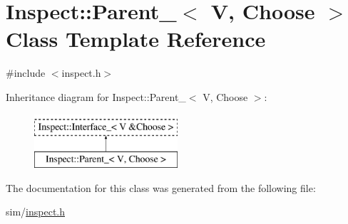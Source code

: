 \hypertarget{class_inspect_1_1_parent__}{\section{Inspect\+:\+:Parent\+\_\+$<$ V, Choose $>$ Class Template Reference}
\label{class_inspect_1_1_parent__}
}


{\ttfamily \#include $<$inspect.\+h$>$}

Inheritance diagram for Inspect\+:\+:Parent\+\_\+$<$ V, Choose $>$\+:\begin{figure}[H]
\begin{center}
\leavevmode
\includegraphics[height=2.000000cm]{class_inspect_1_1_parent__}
\end{center}
\end{figure}


The documentation for this class was generated from the following file\+:\begin{DoxyCompactItemize}
\item 
sim/\hyperlink{inspect_8h}{inspect.\+h}\end{DoxyCompactItemize}
